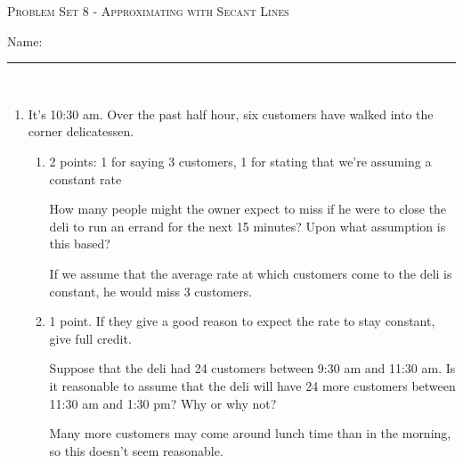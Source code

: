 \documentclass{article}
\begin{document}
\begin{center}
  \large\textsc{Problem Set 8 - Approximating with Secant Lines}\vspace{.5in}
  
   \large Name: \rule{5cm}{0.15mm}\\
\end{center}


\begin{enumerate}
\item %

  It's 10:30 am. Over the past half hour, six customers have walked into the corner delicatessen.

  \begin{enumerate} 

  \item

    \begin{grading}
      2 points: 1 for saying 3 customers, 1 for stating that we're assuming a constant rate
    \end{grading}

    \begin{problem}[\vfill]
      How many people might the owner expect to miss if he were to close the deli to run an errand for the next 15 minutes? Upon what assumption is this based?
    \end{problem}

    \begin{solution} 
      If we assume that the average rate at which customers come to the deli is constant, he would miss $3$ customers.
    \end{solution} 

  \item

    \begin{grading}
      1 point. If they give a good reason to expect the rate to stay constant, give full credit. 
    \end{grading}

    \begin{problem}[\vfill]
      Suppose that the deli had 24 customers between 9:30 am and 11:30 am. Is it reasonable to assume that the deli will have 24 more customers between 11:30 am and 1:30 pm? Why or why not?
    \end{problem}

    \begin{solution}
      Many more customers may come around lunch time than in the morning, so this doesn't seem reasonable.
    \end{solution}


\end{enumerate}
\end{enumerate}
\end{document}
